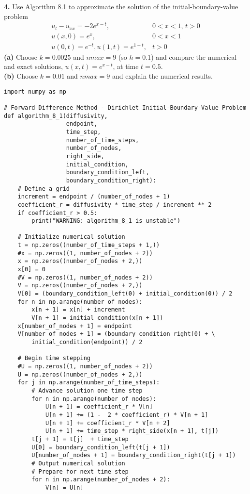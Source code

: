 \documentclass{amsbook}%
\theoremstyle{plain}
\numberwithin{equation}{section}
\begin{document}
		\noindent\textbf{4.} Use Algorithm 8.1 to approximate the solution of the initial-boundary-value problem
		\begin{align}
			u_t-u_{xx}=-2e^{x-t}, & 0<x<1,\, t>0\\
			u(x,0)=e^x, & 0<x<1\\
			u(0,t)=e^{-t}, u(1,t)=e^{1-t}, & t>0
		\end{align}
		\textbf{(a)} Choose $k=0.0025$ and $nmax=9$ (so $h=0.1$) and compare the numerical and exact solutions, $u(x,t)=e^{x-t}$, at time $t=0.5$.\\
		\textbf{(b)} Choose $k=0.01$ and $nmax=9$ and explain the numerical results.
		\\[12pt]
\begin{small}
\begin{verbatim}
import numpy as np

# Forward Difference Method - Dirichlet Initial-Boundary-Value Problem
def algorithm_8_1(diffusivity,
                  endpoint,
                  time_step,
                  number_of_time_steps,
                  number_of_nodes,
                  right_side,
                  initial_condition,
                  boundary_condition_left,
                  boundary_condition_right):
    # Define a grid
    increment = endpoint / (number_of_nodes + 1)
    coefficient_r = diffusivity * time_step / increment ** 2
    if coefficient_r > 0.5:
        print("WARNING: algorithm_8_1 is unstable")
        
    # Initialize numerical solution
    t = np.zeros((number_of_time_steps + 1,))
    #x = np.zeros((1, number_of_nodes + 2))
    x = np.zeros((number_of_nodes + 2,))
    x[0] = 0
    #V = np.zeros((1, number_of_nodes + 2))
    V = np.zeros((number_of_nodes + 2,))
    V[0] = (boundary_condition_left(0) + initial_condition(0)) / 2
    for n in np.arange(number_of_nodes):
        x[n + 1] = x[n] + increment
        V[n + 1] = initial_condition(x[n + 1])
    x[number_of_nodes + 1] = endpoint
    V[number_of_nodes + 1] = (boundary_condition_right(0) + \
    	initial_condition(endpoint)) / 2

    # Begin time stepping
    #U = np.zeros((1, number_of_nodes + 2))
    U = np.zeros((number_of_nodes + 2,))    
    for j in np.arange(number_of_time_steps):
        # Advance solution one time step
        for n in np.arange(number_of_nodes):
            U[n + 1] = coefficient_r * V[n]
            U[n + 1] += (1 -  2 * coefficient_r) * V[n + 1]
            U[n + 1] += coefficient_r * V[n + 2]
            U[n + 1] += time_step * right_side(x[n + 1], t[j])
        t[j + 1] = t[j]  + time_step
        U[0] = boundary_condition_left(t[j + 1])
        U[number_of_nodes + 1] = boundary_condition_right(t[j + 1])        
        # Output numerical solution
        # Prepare for next time step
        for n in np.arange(number_of_nodes + 2):
            V[n] = U[n]
            

\end{verbatim}
\end{small}
\end{document}
